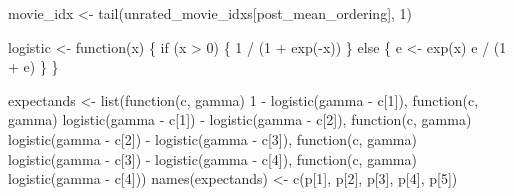 \documentclass[
  letterpaper,
  DIV=11,
  numbers=noendperiod]{scrartcl}
\newenvironment{Shaded}{\begin{snugshade}}{\end{snugshade}}
\newcommand{\ControlFlowTok}[1]{\textcolor[rgb]{0.00,0.23,0.31}{#1}}
\newcommand{\DecValTok}[1]{\textcolor[rgb]{0.68,0.00,0.00}{#1}}
\newcommand{\FunctionTok}[1]{\textcolor[rgb]{0.28,0.35,0.67}{#1}}
\newcommand{\NormalTok}[1]{\textcolor[rgb]{0.00,0.23,0.31}{#1}}
\newcommand{\OtherTok}[1]{\textcolor[rgb]{0.00,0.23,0.31}{#1}}
\newcommand{\SpecialCharTok}[1]{\textcolor[rgb]{0.37,0.37,0.37}{#1}}
\newcommand{\StringTok}[1]{\textcolor[rgb]{0.13,0.47,0.30}{#1}}
\begin{document}
\begin{Shaded}
\begin{Highlighting}[]
\NormalTok{movie\_idx }\OtherTok{\textless{}{-}} \FunctionTok{tail}\NormalTok{(unrated\_movie\_idxs[post\_mean\_ordering], }\DecValTok{1}\NormalTok{)}

\NormalTok{logistic }\OtherTok{\textless{}{-}} \ControlFlowTok{function}\NormalTok{(x) \{}
  \ControlFlowTok{if}\NormalTok{ (x }\SpecialCharTok{\textgreater{}} \DecValTok{0}\NormalTok{) \{}
    \DecValTok{1} \SpecialCharTok{/}\NormalTok{ (}\DecValTok{1} \SpecialCharTok{+} \FunctionTok{exp}\NormalTok{(}\SpecialCharTok{{-}}\NormalTok{x))}
\NormalTok{  \} }\ControlFlowTok{else}\NormalTok{ \{}
\NormalTok{    e }\OtherTok{\textless{}{-}} \FunctionTok{exp}\NormalTok{(x)}
\NormalTok{    e }\SpecialCharTok{/}\NormalTok{ (}\DecValTok{1} \SpecialCharTok{+}\NormalTok{ e)}
\NormalTok{  \}}
\NormalTok{\}}

\NormalTok{expectands }\OtherTok{\textless{}{-}} \FunctionTok{list}\NormalTok{(}\ControlFlowTok{function}\NormalTok{(c, gamma) }\DecValTok{1} \SpecialCharTok{{-}} \FunctionTok{logistic}\NormalTok{(gamma }\SpecialCharTok{{-}}\NormalTok{ c[}\DecValTok{1}\NormalTok{]),}
                   \ControlFlowTok{function}\NormalTok{(c, gamma) }\FunctionTok{logistic}\NormalTok{(gamma }\SpecialCharTok{{-}}\NormalTok{ c[}\DecValTok{1}\NormalTok{]) }\SpecialCharTok{{-}}
                                      \FunctionTok{logistic}\NormalTok{(gamma }\SpecialCharTok{{-}}\NormalTok{ c[}\DecValTok{2}\NormalTok{]),}
                   \ControlFlowTok{function}\NormalTok{(c, gamma) }\FunctionTok{logistic}\NormalTok{(gamma }\SpecialCharTok{{-}}\NormalTok{ c[}\DecValTok{2}\NormalTok{]) }\SpecialCharTok{{-}}
                                      \FunctionTok{logistic}\NormalTok{(gamma }\SpecialCharTok{{-}}\NormalTok{ c[}\DecValTok{3}\NormalTok{]),}
                   \ControlFlowTok{function}\NormalTok{(c, gamma) }\FunctionTok{logistic}\NormalTok{(gamma }\SpecialCharTok{{-}}\NormalTok{ c[}\DecValTok{3}\NormalTok{]) }\SpecialCharTok{{-}}
                                      \FunctionTok{logistic}\NormalTok{(gamma }\SpecialCharTok{{-}}\NormalTok{ c[}\DecValTok{4}\NormalTok{]),}
                   \ControlFlowTok{function}\NormalTok{(c, gamma) }\FunctionTok{logistic}\NormalTok{(gamma }\SpecialCharTok{{-}}\NormalTok{ c[}\DecValTok{4}\NormalTok{]))}
\FunctionTok{names}\NormalTok{(expectands) }\OtherTok{\textless{}{-}} \FunctionTok{c}\NormalTok{(}\StringTok{\textquotesingle{}p[1]\textquotesingle{}}\NormalTok{, }\StringTok{\textquotesingle{}p[2]\textquotesingle{}}\NormalTok{, }\StringTok{\textquotesingle{}p[3]\textquotesingle{}}\NormalTok{, }\StringTok{\textquotesingle{}p[4]\textquotesingle{}}\NormalTok{, }\StringTok{\textquotesingle{}p[5]\textquotesingle{}}\NormalTok{)}


\end{Highlighting}
\end{Shaded}
\end{document}
